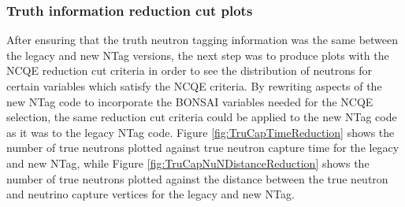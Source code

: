     
\subsubsection{Truth information reduction cut plots}

After ensuring that the truth neutron tagging information was the same between the legacy and new NTag versions, the next step was to produce plots with the NCQE reduction cut criteria in order to see the distribution of neutrons for certain variables which satisfy the NCQE criteria. By rewriting aspects of the new NTag code to incorporate the BONSAI variables needed for the NCQE selection, the same reduction cut criteria could be applied to the new NTag code as it was to the legacy NTag code. Figure \ref{fig:TruCapTimeReduction} shows the number of true neutrons plotted against true neutron capture time for the legacy and new NTag, while Figure \ref{fig:TruCapNuNDistanceReduction} shows the number of true neutrons plotted against the distance between the true neutron and neutrino capture vertices for the legacy and new NTag.

